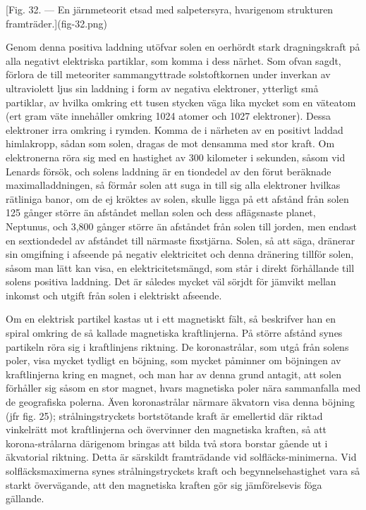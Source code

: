 \documentclass[a4paper, 12pt, oneside, swedish]{article}
\begin{document}
[Fig. 32. --- En järnmeteorit etsad med salpetersyra, hvarigenom strukturen framträder.](fig-32.png)

Genom denna positiva laddning utöfvar solen en oerhördt stark dragningskraft på alla negativt elektriska partiklar, som komma i dess närhet. Som ofvan sagdt, förlora de till meteoriter sammangyttrade solstoftkornen under inverkan av ultraviolett ljus sin laddning i form av negativa elektroner, ytterligt små partiklar, av hvilka omkring ett tusen stycken väga lika mycket som en väteatom (ert gram väte innehåller omkring 1024 atomer och 1027 elektroner). Dessa elektroner irra omkring i rymden. Komma de i närheten av en positivt laddad himlakropp, sådan som solen, dragas de mot densamma med stor kraft. Om elektronerna röra sig med en hastighet av 300 kilometer i sekunden, såsom vid Lenards försök, och solens laddning är en tiondedel av den förut beräknade maximalladdningen, så förmår solen att suga in till sig alla elektroner hvilkas rätliniga banor, om de ej kröktes av solen, skulle ligga på ett afstånd från solen 125 gånger större än afståndet mellan solen och dess aflägsnaste planet, Neptunus, och 3,800 gånger större än afståndet från solen till jorden, men endast en sextiondedel av afståndet till närmaste fixstjärna. Solen, så att säga, dränerar sin omgifning i afseende på negativ elektricitet och denna dränering tillför solen, såsom man lätt kan visa, en elektricitetsmängd, som står i direkt förhållande till solens positiva laddning. Det är således mycket väl sörjdt för jämvikt mellan inkomst och utgift från solen i elektriskt afseende.

Om en elektrisk partikel kastas ut i ett magnetiskt fält, så beskrifver han en spiral omkring de så kallade magnetiska kraftlinjerna. På större afstånd synes partikeln röra sig i kraftlinjens riktning. De koronastrålar, som utgå från solens poler, visa mycket tydligt en böjning, som mycket påminner om böjningen av kraftlinjerna kring en magnet, och man har av denna grund antagit, att solen förhåller sig såsom en stor magnet, hvars magnetiska poler nära sammanfalla med de geografiska polerna. Även koronastrålar närmare äkvatorn visa denna böjning (jfr fig. 25); strålningstryckets bortstötande kraft är emellertid där riktad vinkelrätt mot kraftlinjerna och övervinner den magnetiska kraften, så att korona-strålarna därigenom bringas att bilda två stora borstar gående ut i äkvatorial riktning. Detta är särskildt framträdande vid solfläcks-minimerna. Vid solfläcksmaximerna synes strålningstryckets kraft och begynnelsehastighet vara så starkt övervägande, att den magnetiska kraften gör sig jämförelsevis föga gällande.
\end{document}
